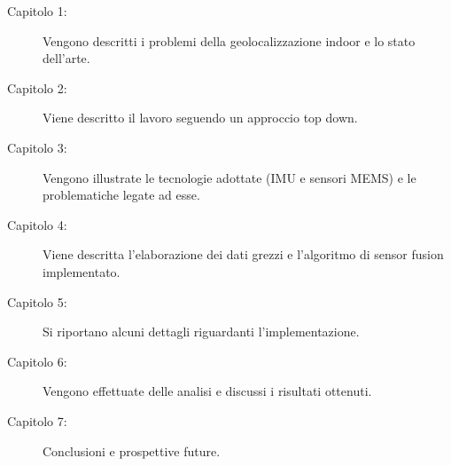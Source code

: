 \begin{description}
\item [Capitolo 1:] Vengono descritti i problemi della geolocalizzazione indoor e lo stato dell'arte.
\item [Capitolo 2:] Viene descritto il lavoro seguendo un approccio top down.
\item [Capitolo 3:] Vengono illustrate le tecnologie adottate (IMU e sensori MEMS) e le problematiche legate ad esse.
\item [Capitolo 4:] Viene descritta l'elaborazione dei dati grezzi e l'algoritmo di sensor fusion implementato.
\item [Capitolo 5:] Si riportano alcuni dettagli riguardanti l'implementazione.
\item [Capitolo 6:] Vengono effettuate delle analisi e discussi i risultati ottenuti.
\item [Capitolo 7:] Conclusioni e prospettive future.
\end{description}